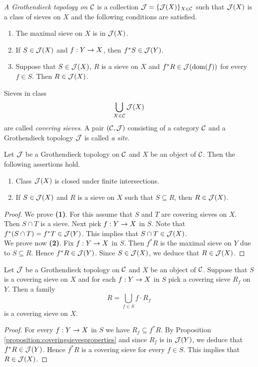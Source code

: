 \begin{definition}
\textit{A Grothendieck topology on ${\mathcal C}$} is a collection ${\mathcal J}=\{{\mathcal J}(X)\}_{X\in {\mathcal C}}$ such that ${\mathcal J}(X)$ is a class of sieves on $X$ and the following conditions are satisfied. 
\begin{enumerate}[label=\textbf{(\arabic*)}, leftmargin=3.0em]
\item The maximal sieve on $X$ is in ${\mathcal J}(X)$.
\item If $S\in {\mathcal J}(X)$ and $f:Y\rightarrow X$, then $f^*S\in {\mathcal J}(Y)$.
\item Suppose that $S\in {\mathcal J}(X)$, $R$ is a sieve on $X$ and $f^*R\in {\mathcal J}(\mathrm{dom}(f))$ for every $f\in S$. Then $R\in {\mathcal J}(X)$.
\end{enumerate}
Sieves in class
$$\bigcup_{X\in {\mathcal C}}{\mathcal J}(X)$$
are called \textit{covering sieves}. A pair $({\mathcal C},{\mathcal J})$ consisting of a category ${\mathcal C}$ and a Grothendieck topology ${\mathcal J}$ is called \textit{a site}.
\end{definition}

\begin{proposition}\label{proposition:coveringsievesproperties}
Let ${\mathcal J}$ be a Grothendieck topology on ${\mathcal C}$ and $X$ be an object of ${\mathcal C}$. Then the following assertions hold.
\begin{enumerate}[label=\emph{\textbf{(\arabic*)}}, leftmargin=3.0em]
\item Class ${\mathcal J}(X)$ is closed under finite intersections.
\item If $S\in {\mathcal J}(X)$ and $R$ is a sieve on $X$ such that $S\subseteq R$, then $R\in {\mathcal J}(X)$.
\end{enumerate}
\end{proposition}
\begin{proof}
We prove \textbf{(1)}. For this assume that $S$ and $T$ are covering sieves on $X$. Then $S\cap T$ is a sieve. Next pick $f:Y\rightarrow X$ in $S$. Note that $f^*(S\cap T)=f^*T\in {\mathcal J}(Y)$. This implies that $S\cap T\in {\mathcal J}(X)$.\\
We prove now \textbf{(2)}. Fix $f:Y\rightarrow X$ in $S$. Then $f^*R$ is the maximal sieve on $Y$ due to $S\subseteq R$. Hence $f^*R\in {\mathcal J}(Y)$. Since $S\in {\mathcal J}(X)$, we deduce that $R\in {\mathcal J}(X)$.
\end{proof}

\begin{fact}\label{fact:compositionofcoveringsieves}
Let ${\mathcal J}$ be a Grothendieck topology on ${\mathcal C}$ and $X$ be an object of ${\mathcal C}$. Suppose that $S$ is a covering sieve on $X$ and for each $f:Y\rightarrow X$ in $S$ pick a covering sieve $R_f$ on $Y$. Then a family
$$R=\bigcup_{f\in S}f\cdot R_f$$ 
is a covering sieve on $X$.
\end{fact}
\begin{proof}
For every $f:Y\rightarrow X$ in $S$ we have $R_f\subseteq f^*R$. By Proposition \ref{proposition:coveringsievesproperties} and since $R_f$ is in ${\mathcal J}(Y)$, we deduce that $f^*R\in {\mathcal J}(Y)$. Hence $f^*R$ is a covering sieve for every $f\in S$. This implies that $R\in {\mathcal J}(X)$.
\end{proof}

